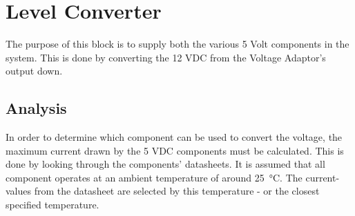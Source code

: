 \newpage
\section{Level Converter}
\label{sec:LevelConverter}
The purpose of this block is to supply both the various 5 Volt components in the system. This is done by converting the 12 VDC from the Voltage Adaptor's output down.

\subsection{Analysis}
In order to determine which component can be used to convert the voltage, the maximum current drawn by the 5 VDC components must be calculated. This is done by looking through the components' datasheets. It is assumed that all component operates at an ambient temperature of around \SI{25}{\celsius}. The current-values from the datasheet are selected by this temperature - or the closest specified temperature.
